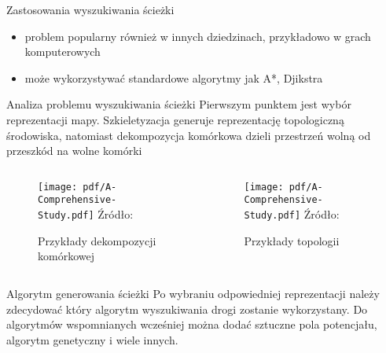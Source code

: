 \begin{frame}
{Zastosowania wyszukiwania ścieżki}
\begin{itemize}
	\item problem popularny również w innych dziedzinach, przykładowo w grach komputerowych \cite{robotics_and_games}
	\item może wykorzystywać standardowe algorytmy jak A*, Djikstra
\end{itemize}
\end{frame}

\begin{frame}
{Analiza problemu wyszukiwania ścieżki}
	Pierwszym punktem jest wybór reprezentacji mapy.
	Szkieletyzacja generuje reprezentację topologiczną środowiska, natomiast dekompozycja komórkowa dzieli przestrzeń wolną od przeszkód na wolne komórki	
	\begin{columns}
		\begin{column}{0.5\textwidth}
			\begin{figure}
				\begin{center}
					\texttt{[image: pdf/A-Comprehensive-Study.pdf]}
					\hspace*{5pt}\hbox{\scriptsize{Źródło:}}
					\caption{Przykłady dekompozycji komórkowej }
				\end{center}
			\end{figure}
		\end{column}
		\begin{column}{0.5\textwidth}  %
						\begin{figure}
				\begin{center}
					\texttt{[image: pdf/A-Comprehensive-Study.pdf]}
					\hspace*{5pt}\hbox{\scriptsize{Źródło:}}
					\caption{Przykłady topologii}
				\end{center}
			\end{figure}
		\end{column}
	\end{columns}
\end{frame}

\begin{frame}
{Algorytm generowania ścieżki}
	Po wybraniu odpowiedniej reprezentacji należy zdecydować który algorytm wyszukiwania drogi zostanie wykorzystany.
	Do algorytmów wspomnianych wcześniej można dodać sztuczne pola potencjału, algorytm genetyczny i wiele innych.
\end{frame}

